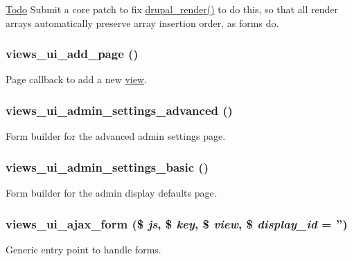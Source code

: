\begin{Desc}
\item[\hyperlink{todo__todo000078}{Todo}]Submit a core patch to fix \hyperlink{common_8inc_a05798b44e8d6c496d4bee5cc32fa7851}{drupal\_\-render()} to do this, so that all render arrays automatically preserve array insertion order, as forms do. \end{Desc}
\hypertarget{admin_8inc_af5b029abb01c601d29c40a83733a725d}{
\subsubsection[{views\_\-ui\_\-add\_\-page}]{\setlength{\rightskip}{0pt plus 5cm}views\_\-ui\_\-add\_\-page ()}}
\label{admin_8inc_af5b029abb01c601d29c40a83733a725d}
Page callback to add a new \hyperlink{classview}{view}. \hypertarget{admin_8inc_acba3ba9c4723a90c445a86b42e32b178}{
\subsubsection[{views\_\-ui\_\-admin\_\-settings\_\-advanced}]{\setlength{\rightskip}{0pt plus 5cm}views\_\-ui\_\-admin\_\-settings\_\-advanced ()}}
\label{admin_8inc_acba3ba9c4723a90c445a86b42e32b178}
Form builder for the advanced admin settings page. \hypertarget{admin_8inc_a4657997fea8295005c67fe12a3e89e6b}{
\subsubsection[{views\_\-ui\_\-admin\_\-settings\_\-basic}]{\setlength{\rightskip}{0pt plus 5cm}views\_\-ui\_\-admin\_\-settings\_\-basic ()}}
\label{admin_8inc_a4657997fea8295005c67fe12a3e89e6b}
Form builder for the admin display defaults page. \hypertarget{admin_8inc_a9469fe3e11f533b7cd255191f4b1ac7e}{
\subsubsection[{views\_\-ui\_\-ajax\_\-form}]{\setlength{\rightskip}{0pt plus 5cm}views\_\-ui\_\-ajax\_\-form (\$ {\em js}, \/  \$ {\em key}, \/  \$ {\em view}, \/  \$ {\em display\_\-id} = {\ttfamily ''})}}
\label{admin_8inc_a9469fe3e11f533b7cd255191f4b1ac7e}
Generic entry point to handle forms.

